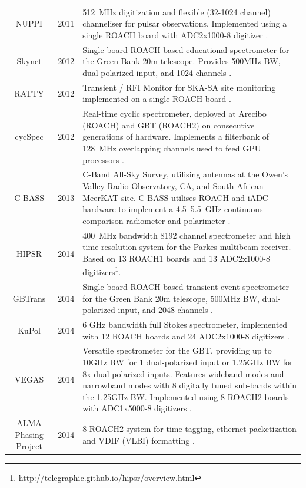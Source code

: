 \documentclass{ws-jai}
\begin{document}
\begin{longtable}{ccp{10cm}}
  NUPPI            & 2011 & 512~MHz digitization and flexible (32-1024 channel) channeliser for pulsar observations. Implemented using a single ROACH board with ADC2x1000-8 digitizer \citep{2014MNRAS.443.3752L}. \\
  Skynet           & 2012 & Single board ROACH-based educational spectrometer for the Green Bank 20m telescope. Provides 500MHz BW, dual-polarized input, and 1024 channels \citep{skynet}. \\
  RATTY            & 2012 & Transient / RFI Monitor for SKA-SA site monitoring implemented on a single ROACH board \citep{Foley01082016, man14}. \\
  cycSpec          & 2012 & Real-time cyclic spectrometer, deployed at Arecibo (ROACH) and GBT (ROACH2) on consecutive generations of hardware. Implements a filterbank of 128~MHz overlapping channels used to feed GPU processors \citep{cycspec}. \\
  C-BASS           & 2013 & C-Band All-Sky Survey, utilising antennas at the Owen's Valley Radio Observatory, CA, and South African MeerKAT site. C-BASS utilises ROACH and iADC hardware to implement a 4.5--5.5~GHz continuous comparison radiometer and polarimeter \citep{chuckles-thesis}.\\
  HIPSR            & 2014 & 400~MHz bandwidth 8192 channel spectrometer and high time-resolution system for the Parkes multibeam receiver. Based on 13 ROACH1 boards and 13 ADC2x1000-8 digitizers\footnote{\url{http://telegraphic.github.io/hipsr/overview.html}}. \\
  GBTrans          & 2014 & Single board ROACH-based transient event spectrometer for the Green Bank 20m telescope, 500MHz BW, dual-polarized input, and 2048 channels \citep{gbtrans}. \\
  KuPol            & 2014 & 6 GHz bandwidth full Stokes spectrometer, implemented with 12 ROACH boards and 24 ADC2x1000-8 digitizers \citep{2013arXiv1303.2131M}. \\
  VEGAS            & 2014 & Versatile spectrometer for the GBT, providing up to 10GHz BW for 1 dual-polarized input or 1.25GHz BW for 8x dual-polarized inputs. Features wideband modes and narrowband modes with 8 digitally tuned sub-bands within the 1.25GHz BW. Implemented using 8 ROACH2 boards with ADC1x5000-8 digitizers \citep{chennamangalam2014gpu}. \\
  ALMA Phasing Project& 2014 & 8 ROACH2 system for time-tagging, ethernet packetization and VDIF (VLBI) formatting \citep{2012evn..confE..53A}. \\

\end{longtable}
\end{document}
